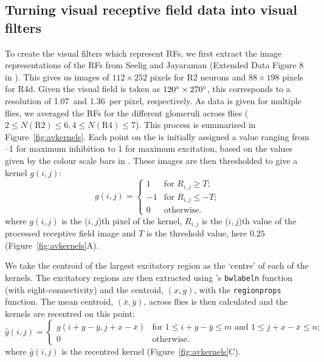 \subsection*{Turning visual receptive field data into visual filters}
\label{sec:methods:preprocessing}
To create the visual filters which represent \acp{RF}, we first extract the image representations of the \acp{RF} from Seelig and Jayaraman (Extended Data Figure 8 in \cite{Seelig2013}).
This gives us images of $112\times 252$ pixels for R2 neurons and $88\times 198$ pixels for R4d.
Given the visual field is taken as $120\degree\times 270\degree$, this corresponds to a resolution of 1.07\degree\ and 1.36\degree\ per pixel, respectively.
As data is given for multiple flies, we averaged the \acp{RF} for the different glomeruli across flies ($2\le N(\mathrm{R2}) \le 6, 4\le N(\mathrm{R4})\le 7$).
This process is summarised in Figure~\ref{fig:avkernels}.
Each point on the is initially assigned a value ranging from --1 for maximum inhibition to 1 for maximum excitation, based on the values given by the colour scale bars in \cite{Seelig2013}.
These images are then thresholded to give a kernel $g(i,j)$:
$$
g(i,j) = \left\{ \begin{array}{rl}
1 & \mbox{for } R_{i,j} \ge T; \\
-1 & \mbox{for } R_{i,j} \le -T; \\
0 & \mbox{otherwise.}
\end{array}
\right.
$$
where $g(i,j)$ is the ($i,j$)th pixel of the kernel, $R_{i,j}$ is the ($i,j$)th value of the processed receptive field image and $T$ is the threshold value, here $0.25$ (Figure~\ref{fig:avkernels}A).

We take the centroid of the largest excitatory region as the `centre' of each of the kernels.
The excitatory regions are then extracted using \Matlab's \texttt{bwlabeln} function (with eight-connectivity) and the centroid, $(x,y)$, with the \texttt{regionprops} function.
The mean centroid, $(\bar{x},\bar{y})$, across flies is then calculated and the kernels are recentred on this point:
$$
\hat{g}(i,j) = \left\{ \begin{array}{ll} g(i+y-\bar{y},j+x-\bar{x}) & \mbox{for } 1\le i+y-\bar{y}\le m \mbox{ and } 1\le j+x-\bar{x}\le n;\\
0 & \mbox{otherwise.} \end{array} \right.
$$
where $\hat{g}(i,j)$ is the recentred kernel (Figure~\ref{fig:avkernels}C).

